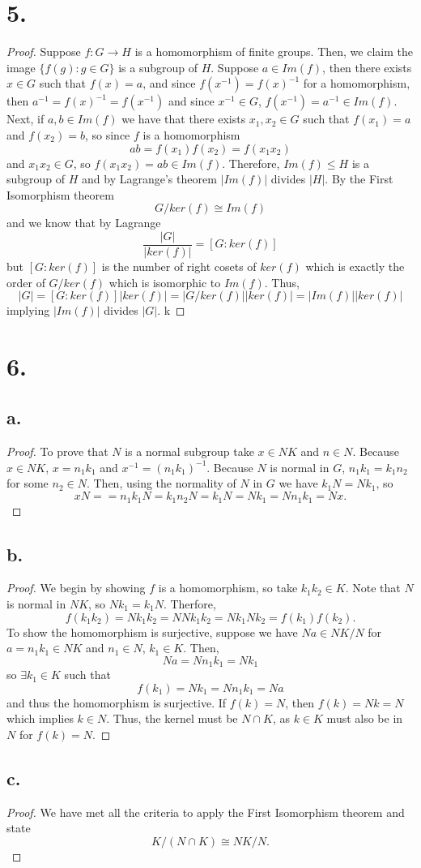 \documentclass{article}
\begin{document}
\section*{5.}
\begin{proof}
    Suppose $f:G \to H$ is a homomorphism of finite groups. Then, we claim the image $\{f(g) : g \in G\}$ is a subgroup of $H$. Suppose $a \in Im(f)$, then there exists $x \in G$ such that $f(x) = a$, and since $f(x^{-1}) = f(x)^{-1}$ for a homomorphism, then $a^{-1} = f(x)^{-1} = f(x^{-1})$ and since $x^{-1} \in G$, $f(x^{-1}) = a^{-1} \in Im(f)$. Next, if $a, b \in Im(f)$ we have that there exists $x_1, x_2 \in G$ such that $f(x_1) = a$ and $f(x_2) = b$, so since $f$ is a homomorphism
    \[
    ab = f(x_1)f(x_2) = f(x_1x_2)    
    \]
    and $x_1x_2 \in G$, so $f(x_1x_2) = ab \in Im(f)$. 
    Therefore, $Im(f) \leq H$ is a subgroup of $H$ and by Lagrange's theorem $|Im(f)|$ divides $|H|$. By the First Isomorphism theorem 
    \[
    G/ker(f) \cong Im(f)  
    \]
    and we know that by Lagrange 
    \[
    \frac{|G|}{|ker(f)|} = [G: ker(f)]    
    \]
    but $[G: ker(f)]$ is the number of right cosets of $ker(f)$ which is exactly the order of $G/ker(f)$ which is isomorphic to $Im(f)$. Thus, 
    \[
    |G| = [G: ker(f)]|ker(f)| = |G/ker(f)||ker(f)| = |Im(f)||ker(f)|    
    \]
    implying $|Im(f)|$ divides $|G|$. k
\end{proof}

\section*{6.}
\subsection*{a.}
\begin{proof}
To prove that $N$ is a normal subgroup take $x \in NK$ and $n \in N$. Because $x \in NK$, $x = n_1k_1$ and $x^{-1} = (n_1k_1)^{-1}$. Because $N$ is normal in $G$, $n_1k_1 = k_1n_2$ for some $n_2 \in N$. Then, using the normality of $N$ in $G$ we have $k_1N = Nk_1$, so  \[
xN = = n_1k_1N = k_1n_2N = k_1N = Nk_1 = Nn_1k_1 = Nx.\] 

\end{proof}
\subsection*{b.}
\begin{proof}
    We begin by showing $f$ is a homomorphism, so take $k_1k_2 \in K$. Note that $N$ is normal in $NK$, so $Nk_1 = k_1N$. Therfore, 
    \[
    f(k_1k_2) = Nk_1k_2 = NNk_1k_2 = Nk_1Nk_2 = f(k_1)f(k_2).    
    \]
    To show the homomorphism is surjective, suppose we have $Na \in NK/N$ for $a = n_1k_1 \in NK$ and $n_1 \in N$, $k_1 \in K$. Then, 
    \[
    Na = Nn_1k_1 = Nk_1    
    \]
    so $\exists k_1 \in K$ such that 
    \[
    f(k_1) = Nk_1 = Nn_1k_1 = Na    
    \]
    and thus the homomorphism is surjective. If $f(k) = N$, then $f(k) = Nk = N$ which implies $k \in N$. Thus, the kernel must be $N \cap K$, as $k \in K$ must also be in $N$ for $f(k) = N$. 
\end{proof}
\subsection*{c.}
\begin{proof}
    We have met all the criteria to apply the First Isomorphism theorem and state
   \[
   K/(N \cap K) \cong NK / N. 
   \] 
\end{proof}
\end{document}

